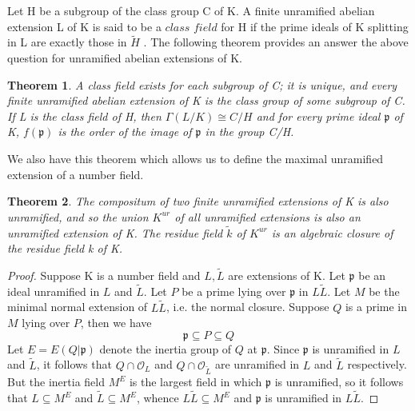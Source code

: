 \documentclass[preprint,12pt,reqno]{elsarticle}
\newtheorem{theorem}{Theorem}
\begin{document}
Let H be a subgroup of the class group C of K. A finite unramified abelian extension L of K is said to be a $\textit{class field}$ for H if the prime ideals of K splitting in L are exactly those in $\tilde{H}$ . The following theorem provides an answer the above question for unramified abelian extensions of K.
\begin{theorem}
A class field exists for each subgroup of C; it is unique, and every finite unramified abelian extension of K is the class group of some subgroup of C. If L is the class field of H, then $\Gamma(L/K)\cong C/H$ and for every prime ideal $\mathfrak{p}$ of K, $f(\mathfrak{p})$ is the order of the image of $\mathfrak{p}$ in the group C/H.
\end{theorem}
We also have this theorem which allows us to define the maximal unramified extension of a number field. 
\begin{theorem}
The compositum of two finite unramified extensions of K is also unramified, and so the union $K^{ur}$ of all unramified extensions is also an unramified extension of K. The residue field $\tilde{k}$ of $K^{ur}$ is an algebraic closure of the residue field k of K.
\end{theorem}
\begin{proof}
    Suppose K is a number field and $L,\tilde{L}$ are extensions of K. Let $\mathfrak{p}$ be an ideal unramified in $L$ and $\tilde{L}$. Let $P$ be a prime lying over $\mathfrak{p}$ in $L\tilde{L}$. Let $M$ be the minimal normal extension of $L\tilde{L}$, i.e. the normal closure. Suppose $Q$ is a prime in $M$ lying over $P$, then we have 
    \begin{equation}
        \mathfrak{p}\subseteq P \subseteq Q
    \end{equation}
    Let $E=E(Q|\mathfrak{p})$ denote the inertia group of $Q$ at $\mathfrak{p}$. Since $\mathfrak{p}$ is unramified in $L$ and $\tilde{L}$, it follows that $Q \cap \mathcal{O}_L$ and $Q \cap \mathcal{O}_\tilde{L}$ are unramified in $L$ and $\tilde{L}$ respectively. But the inertia field $M^E$ is the largest field in which $\mathfrak{p}$ is unramified, so it follows that $L\subseteq M^E$ and $\tilde{L} \subseteq M^E $, whence $L\tilde{L}\subseteq M^E$ and $\mathfrak{p}$ is unramified in $L\tilde{L}$.
\end{proof}
\end{document}
